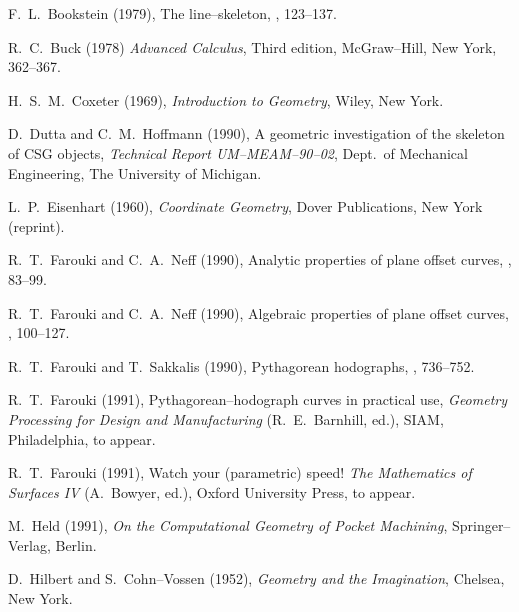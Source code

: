 \begin{thebibliography}{99}

F.~L.~Bookstein (1979), The line--skeleton, , 123--137.


R.~C.~Buck (1978) {\it Advanced Calculus}, Third edition, McGraw--Hill,
New York, 362--367.


H.~S.~M.~Coxeter (1969), {\it Introduction to Geometry}, Wiley,
New York.


D.~Dutta and C.~M.~Hoffmann (1990), A geometric investigation of the
skeleton of CSG objects, {\it Technical Report UM--MEAM--90--02},
Dept.\ of Mechanical Engineering, The University of Michigan.

L.~P.~Eisenhart (1960), {\it Coordinate Geometry}, Dover Publications,
New York (reprint).

R.~T.~Farouki and C.~A.~Neff (1990), Analytic properties of plane
offset curves, , 83--99.

R.~T.~Farouki and C.~A.~Neff (1990), Algebraic properties of plane
offset curves, , 100--127.

R.~T.~Farouki and T.~Sakkalis (1990), Pythagorean hodographs,
, 736--752.

R.~T.~Farouki (1991), Pythagorean--hodograph curves in practical use,
{\it Geometry Processing for Design and Manufacturing\/} (R.~E.~Barnhill,
ed.), SIAM, Philadelphia, to appear.

R.~T.~Farouki (1991), Watch your (parametric) speed! {\it The
Mathematics of Surfaces IV\/} (A.~Bowyer, ed.), Oxford University
Press, to appear.

M.~Held (1991), {\it On the Computational Geometry of Pocket Machining},
Springer--Verlag, Berlin.

D.~Hilbert and S.~Cohn--Vossen (1952), {\it Geometry and the Imagination},
Chelsea, New York.


\end{thebibliography}
